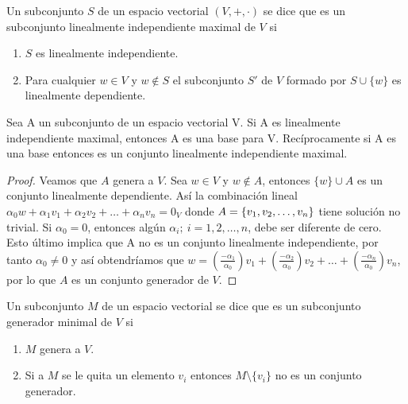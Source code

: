 \begin{dfn}
Un subconjunto $S$ de un espacio vectorial $(V, +, \cdot)$ se dice que es un subconjunto linealmente independiente maximal de $V$ si\\
\begin{enumerate}
\item $S$ es linealmente independiente.
\item Para cualquier $w \in V$ y $w \notin S$ el subconjunto $S'$ de $V$ formado por $S \cup \{w\}$ es linealmente dependiente.
\end{enumerate}
\end{dfn}

\begin{theorem}
Sea A un subconjunto de un espacio vectorial V. Si A es linealmente independiente maximal, entonces A es una base para V. Recíprocamente si A es una base entonces es un conjunto linealmente independiente maximal.
\end{theorem}
\begin{proof}
Veamos que $A$ genera a $V$. Sea $w \in V$ y $w \notin A$, entonces $\{w\}\cup A$ es un conjunto linealmente dependiente. Así la combinación lineal $\alpha_0 w+\alpha_1v_1+\alpha_2v_2+\hdots+\alpha_nv_n=0_V$ donde $A= \lbrace v_1, v_2, \ldots, v_n \rbrace$ tiene solución no trivial. Si $\alpha_0=0$, entonces algún $\alpha_i;\ i=1, 2, \hdots, n$, debe ser diferente de cero. Esto último implica que A no es un conjunto linealmente independiente, por tanto $\alpha_0\neq 0$ y así obtendríamos que $w=\left(\frac{-\alpha_1}{\alpha_0}\right)v_1+\left(\frac{-\alpha_2}{\alpha_0}\right)v_2+\hdots+\left(\frac{-\alpha_n}{\alpha_0}\right)v_n$, por lo que $A$ es un conjunto generador de $V$.
\end{proof}
\begin{dfn}
Un subconjunto $M$ de un espacio vectorial se dice que es un subconjunto generador minimal de $V$ si
\begin{enumerate}
\item $M$ genera a $V$.
\item Si a $M$ se le quita un elemento $v_i$ entonces $M \setminus \{v_i\}$ no es un conjunto generador.
\end{enumerate}
\end{dfn}


